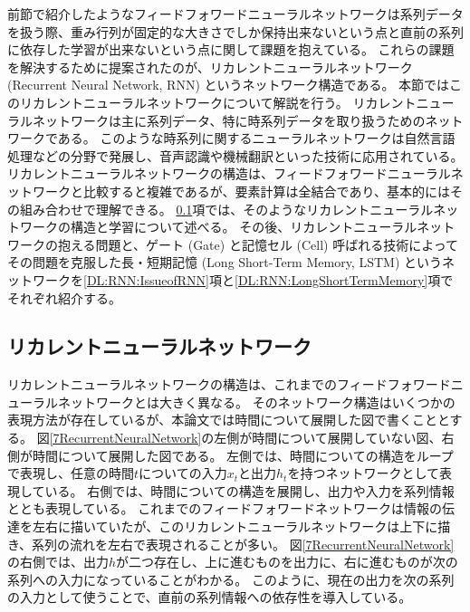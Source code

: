 前節で紹介したようなフィードフォワードニューラルネットワークは系列データを扱う際、重み行列が固定的な大きさでしか保持出来ないという点と直前の系列に依存した学習が出来ないという点に関して課題を抱えている。
これらの課題を解決するために提案されたのが、リカレントニューラルネットワーク (Recurrent Neural Network, RNN) というネットワーク構造である。
本節ではこのリカレントニューラルネットワークについて解説を行う。
リカレントニューラルネットワークは主に系列データ、特に時系列データを取り扱うためのネットワークである。
このような時系列に関するニューラルネットワークは自然言語処理などの分野で発展し、音声認識や機械翻訳といった技術に応用されている。
リカレントニューラルネットワークの構造は、フィードフォワードニューラルネットワークと比較すると複雑であるが、要素計算は全結合であり、基本的にはその組み合わせで理解できる。
\ref{DL:RNN:ReccurentNeuralNetwork}項では、そのようなリカレントニューラルネットワークの構造と学習について述べる。
その後、リカレントニューラルネットワークの抱える問題と、ゲート (Gate) と記憶セル (Cell) 呼ばれる技術によってその問題を克服した長・短期記憶 (Long Short-Term Memory, LSTM\cite{LSTMpaper}) というネットワークを\ref{DL:RNN:IssueofRNN}項と\ref{DL:RNN:LongShortTermMemory}項でそれぞれ紹介する。


\subsection{リカレントニューラルネットワーク} \label{DL:RNN:ReccurentNeuralNetwork}

リカレントニューラルネットワークの構造は、これまでのフィードフォワードニューラルネットワークとは大きく異なる。
そのネットワーク構造はいくつかの表現方法が存在しているが、本論文では時間について展開した図で書くこととする。
図\ref{7RecurrentNeuralNetwork}の左側が時間について展開していない図、右側が時間について展開した図である。
左側では、時間についての構造をループで表現し、任意の時間$t$についての入力$x_t$と出力$h_t$を持つネットワークとして表現している。
右側では、時間についての構造を展開し、出力や入力を系列情報ととも表現している。
これまでのフィードフォワードネットワークは情報の伝達を左右に描いていたが、このリカレントニューラルネットワークは上下に描き、系列の流れを左右で表現されることが多い。
図\ref{7RecurrentNeuralNetwork}の右側では、出力$h$が二つ存在し、上に進むものを出力に、右に進むものが次の系列への入力になっていることがわかる。
このように、現在の出力を次の系列の入力として使うことで、直前の系列情報への依存性を導入している。


